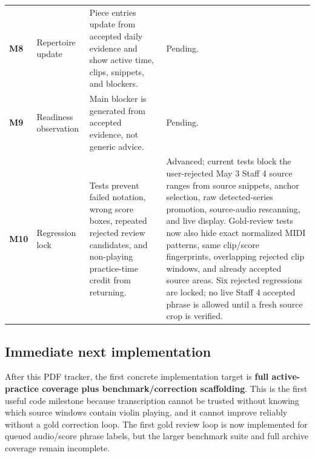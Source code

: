 \begin{table}[htbp]
\begin{tabularx}{\textwidth}{>{\bfseries}p{}p{}X p{}}
M8 & Repertoire update & Piece entries update from accepted daily evidence and show active time, clips, snippets, and blockers. & Pending. \\
M9 & Readiness observation & Main blocker is generated from accepted evidence, not generic advice. & Pending. \\
M10 & Regression lock & Tests prevent failed notation, wrong score boxes, repeated rejected review candidates, and non-playing practice-time credit from returning. & Advanced; current tests block the user-rejected May 3 Staff 4 source ranges from source snippets, anchor selection, raw detected-series promotion, source-audio rescanning, and live display. Gold-review tests now also hide exact normalized MIDI patterns, same clip/score fingerprints, overlapping rejected clip windows, and already accepted source areas. Six rejected regressions are locked; no live Staff 4 accepted phrase is allowed until a fresh source crop is verified. \\
\bottomrule
\end{tabularx}
\end{table}

\subsection{Immediate next implementation}

After this PDF tracker, the first concrete implementation target is \textbf{full active-practice coverage plus benchmark/correction scaffolding}. This is the first useful code milestone because transcription cannot be trusted without knowing which source windows contain violin playing, and it cannot improve reliably without a gold correction loop. The first gold review loop is now implemented for queued audio/score phrase labels, but the larger benchmark suite and full archive coverage remain incomplete.

